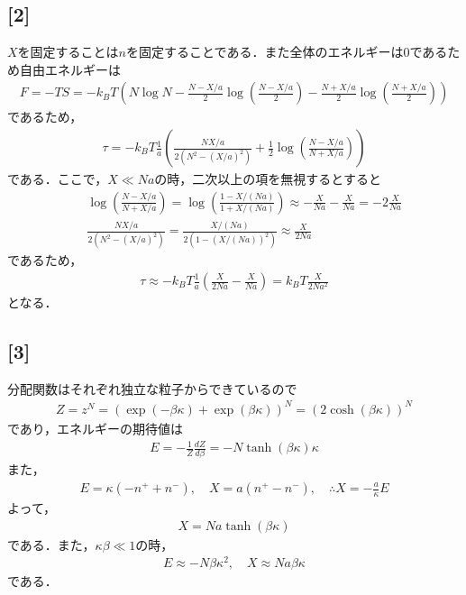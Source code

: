 \documentclass[12pt,dvipdfmx]{jsarticle}
\begin{document}
\subsection*{\large{[2]}}
$X$を固定することは$n$を固定することである．また全体のエネルギーは$0$であるため自由エネルギーは
\begin{eqnarray}
  F = -TS = -k_BT\left( N\log N - \frac{N-X/a}{2}\log\left( \frac{N-X/a}{2}\right)-\frac{N+X/a}{2}\log\left( \frac{N+X/a}{2}\right) \right)
\end{eqnarray}
であるため，
\begin{eqnarray}
  \tau = -k_BT\frac{1}{a}\left( \frac{NX/a}{2(N^2-(X/a)^2)} + \frac{1}{2}\log \left( \frac{N-X/a}{N+X/a} \right)\right)
\end{eqnarray}
である．ここで，$X\ll Na$の時，二次以上の項を無視するとすると
\begin{eqnarray}
  &&\log \left( \frac{N-X/a}{N+X/a} \right) = \log \left( \frac{1-X/(Na)}{1+X/(Na)} \right) \approx -\frac{X}{Na} - \frac{X}{Na} = -2\frac{X}{Na}\\
  &&\frac{NX/a}{2(N^2-(X/a)^2)} = \frac{X/(Na)}{2(1-(X/(Na))^2)}\approx \frac{X}{2Na}
\end{eqnarray}
であるため，
\begin{eqnarray}
  \tau \approx -k_B T\frac{1}{a}\left( \frac{X}{2Na}-\frac{X}{Na} \right) = k_B T \frac{X}{2Na^2}
\end{eqnarray}
となる．
\subsection*{\large{[3]}}
分配関数はそれぞれ独立な粒子からできているので
\begin{eqnarray}
  Z = z^N  = \left( \exp(-\beta\kappa)+\exp(\beta\kappa) \right)^N = (2\cosh(\beta\kappa))^N
\end{eqnarray}
であり，エネルギーの期待値は
\begin{eqnarray}
  E = -\frac{1}{Z}\frac{dZ}{d\beta} = -N\tanh(\beta\kappa)\kappa
\end{eqnarray}
また，
\begin{eqnarray}
  E = \kappa(-n^{+}+n^{-}), \quad X = a(n^{+}-n^{-}),\quad\therefore X = -\frac{a}{\kappa}E
\end{eqnarray}
よって，
\begin{eqnarray}
  X = Na \tanh(\beta\kappa)
\end{eqnarray}
である．また，$\kappa\beta \ll 1$の時，
\begin{eqnarray}
  E\approx - N\beta\kappa^2, \quad X\approx Na \beta \kappa
\end{eqnarray}
である．
\end{document}
